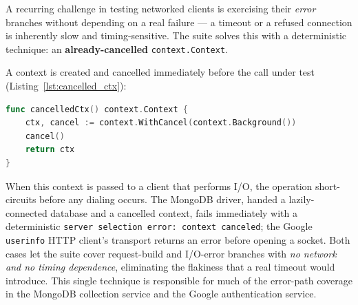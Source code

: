 A recurring challenge in testing networked clients is exercising their \emph{error} branches without depending on a real failure --- a timeout or a refused connection is inherently slow and timing-sensitive. The suite solves this with a deterministic technique: an \textbf{already-cancelled} \texttt{context.Context}.

A context is created and cancelled immediately before the call under test (Listing~\ref{lst:cancelled_ctx}):

\begin{lstlisting}[language=Go, caption={The cancelled-context helper: a context cancelled before use, forcing networked clients down their error path deterministically.}, label={lst:cancelled_ctx}]
func cancelledCtx() context.Context {
    ctx, cancel := context.WithCancel(context.Background())
    cancel()
    return ctx
}
\end{lstlisting}

When this context is passed to a client that performs I/O, the operation short-circuits before any dialing occurs. The MongoDB driver, handed a lazily-connected database and a cancelled context, fails immediately with a deterministic \texttt{server selection error: context canceled}; the Google \texttt{userinfo} HTTP client's transport returns an error before opening a socket. Both cases let the suite cover request-build and I/O-error branches with \emph{no network and no timing dependence}, eliminating the flakiness that a real timeout would introduce. This single technique is responsible for much of the error-path coverage in the MongoDB collection service and the Google authentication service.
